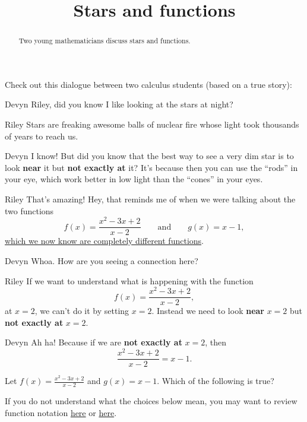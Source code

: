 \documentclass{ximera}
\title[Break-Ground:]{Stars and functions}
\begin{document}
\begin{abstract}
Two young mathematicians discuss stars and functions.
\end{abstract}
\maketitle

Check out this dialogue between two calculus students (based on a true
story):

\begin{dialogue}
\item[Devyn] Riley, did you know I like looking at the stars at night?
\item[Riley] Stars are freaking awesome balls of nuclear fire whose
  light took thousands of years to reach us.
\item[Devyn] I know! But did you know that the best way to see a very
  dim star is to look \textbf{near} it but \textbf{not exactly at} it? It's
  because then you can use the ``rods'' in your eye, which work better
  in low light than the ``cones'' in your eyes.
\item[Riley] That's amazing! Hey, that reminds me of when we were talking about the two functions
  \[
  f(x) = \frac{x^2-3x+2}{x-2}\qquad\text{and}\qquad g(x)= x-1,
  \]
  \href{https://ximera.osu.edu/math160fa17/m160prerequisites/understandingFunctions/breakGround}{which we now know are completely different functions}.
\item[Devyn] Whoa. How are you seeing a connection here?
\item[Riley] If we want to understand what is happening with the
  function
  \[
  f(x) = \frac{x^2-3x+2}{x-2},
  \]
  at $x=2$, we can't do it by setting $x=2$. Instead we need to look
  \textbf{near} $x=2$ but \textbf{not exactly at} $x=2$.
  \item[Devyn] Ah ha! Because if we are \textbf{not exactly at} $x=2$,
    then
    \[
    \frac{x^2-3x+2}{x-2} = x-1.
    \]
\end{dialogue}

\begin{problem}
  Let $f(x) = \frac{x^2-3x+2}{x-2}$ and $g(x) = x-1$. Which of the following is true?
  
  \begin{hint}
If you do not understand what the choices below mean, you may want to review function notation \href{https://ximera.osu.edu/math160fa17/m160prerequisites/prerequisiteVideos/functionNotation}{here} or \href{https://ximera.osu.edu/math160fa17/m160prerequisites/understandingFunctions/digInForEachInputExactlyOneOutput}{here}.
  \end{hint}
  
   \begin{multipleChoice}
  \end{multipleChoice}
\end{problem}
\end{document}
